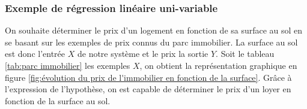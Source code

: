 \subsubsection{Exemple de régression linéaire uni-variable}
\label{Le Machine Learning:Les différents algorithmes d'apprentissage supervisé: La regression linéaire: Exemple de régression linéaire uni-variable}
On souhaite déterminer le prix d'un logement en fonction de sa surface au sol en se basant sur les exemples de prix connus du parc immobilier. 
La surface au sol est donc l'entrée $X$ de notre système et le prix la sortie $Y$. Soit le tableau \ref {tab:parc immobilier} les exemples $X$, on obtient la représentation graphique en figure 	\ref{fig:évolution du prix de l'immobilier en fonction de la surface}. Grâce à l'expression de l'hypothèse, on est capable de déterminer le prix d'un loyer en fonction de la surface au sol.  
%
%
%
%

